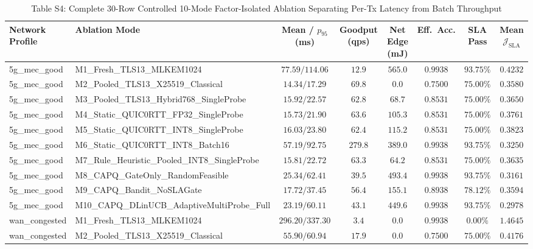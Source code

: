 \documentclass[10pt,journal,compsoc]{IEEEtran}
\begin{document}
\begin{table}[!t]
\centering
\caption{Table S4: Complete 30-Row Controlled 10-Mode Factor-Isolated Ablation Separating Per-Tx Latency from Batch Throughput}
\setlength{\tabcolsep}{3.6pt}
\renewcommand{\arraystretch}{1.02}
\begin{adjustbox}{max width=\textwidth}
\begin{tabular}{@{}llcccccc@{}}
\toprule
\textbf{Network Profile} & \textbf{Ablation Mode} & \textbf{Mean / $p_{95}$ (ms)} & \textbf{Goodput (qps)} & \textbf{Net Edge (mJ)} & \textbf{Eff.\ Acc.} & \textbf{SLA Pass} & \textbf{Mean $\mathcal{J}_{\mathrm{SLA}}$} \\
\midrule
5g\_mec\_good & M1\_Fresh\_TLS13\_MLKEM1024 & $77.59 / 114.06$ & $12.9$ & $565.0$ & $0.9938$ & $93.75\%$ & $0.4232$ \\
5g\_mec\_good & M2\_Pooled\_TLS13\_X25519\_Classical & $14.34 / 17.29$ & $69.8$ & $0.0$ & $0.7500$ & $75.00\%$ & $0.3580$ \\
5g\_mec\_good & M3\_Pooled\_TLS13\_Hybrid768\_SingleProbe & $15.92 / 22.57$ & $62.8$ & $68.7$ & $0.8531$ & $75.00\%$ & $0.3650$ \\
5g\_mec\_good & M4\_Static\_QUIC0RTT\_FP32\_SingleProbe & $15.73 / 21.90$ & $63.6$ & $105.3$ & $0.8531$ & $75.00\%$ & $0.3761$ \\
5g\_mec\_good & M5\_Static\_QUIC0RTT\_INT8\_SingleProbe & $16.03 / 23.80$ & $62.4$ & $115.2$ & $0.8531$ & $75.00\%$ & $0.3823$ \\
5g\_mec\_good & M6\_Static\_QUIC0RTT\_INT8\_Batch16 & $57.19 / 92.75$ & $279.8$ & $389.0$ & $0.9938$ & $93.75\%$ & $0.3250$ \\
5g\_mec\_good & M7\_Rule\_Heuristic\_Pooled\_INT8\_SingleProbe & $15.81 / 22.72$ & $63.3$ & $64.2$ & $0.8531$ & $75.00\%$ & $0.3635$ \\
5g\_mec\_good & M8\_CAPQ\_GateOnly\_RandomFeasible & $25.34 / 62.41$ & $39.5$ & $493.4$ & $0.9938$ & $93.75\%$ & $0.3161$ \\
5g\_mec\_good & M9\_CAPQ\_Bandit\_NoSLAGate & $17.72 / 37.45$ & $56.4$ & $155.1$ & $0.8938$ & $78.12\%$ & $0.3594$ \\
5g\_mec\_good & M10\_CAPQ\_DLinUCB\_AdaptiveMultiProbe\_Full & $23.19 / 60.11$ & $43.1$ & $449.6$ & $0.9938$ & $93.75\%$ & $0.2978$ \\
wan\_congested & M1\_Fresh\_TLS13\_MLKEM1024 & $296.20 / 337.30$ & $3.4$ & $0.0$ & $0.9938$ & $0.00\%$ & $1.4645$ \\
wan\_congested & M2\_Pooled\_TLS13\_X25519\_Classical & $55.90 / 60.94$ & $17.9$ & $0.0$ & $0.7500$ & $75.00\%$ & $0.4176$ \\

\end{tabular}
\end{adjustbox}
\end{table}
\end{document}
